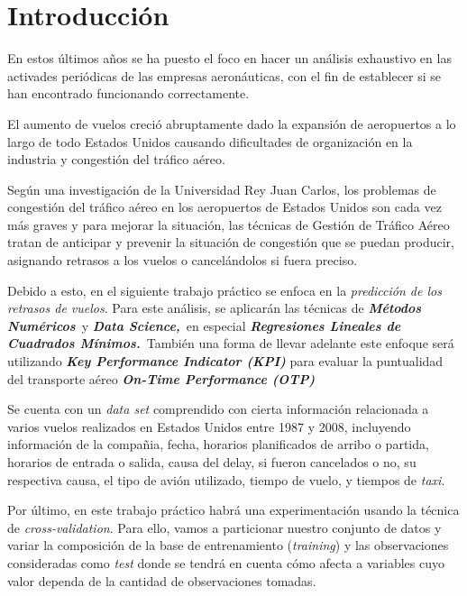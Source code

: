 \section{Introducción}

En estos últimos años se ha puesto el foco en hacer un análisis
exhaustivo en las activades periódicas de las empresas aeronáuticas,
con el fin de establecer si se han encontrado funcionando
correctamente.

\vspace{0.5em} El aumento de vuelos creció abruptamente dado la
expansión de aeropuertos a lo largo de todo Estados Unidos causando
dificultades de organización en la industria y congestión del tráfico
aéreo.

\vspace{0.5em} \cite{alonso2010mathematical} Según una investigación
de la Universidad Rey Juan Carlos, los problemas de congestión del
tráfico aéreo en los aeropuertos de Estados Unidos son cada vez más
graves y para mejorar la situación, las técnicas de Gestión de Tráfico
Aéreo tratan de anticipar y prevenir la situación de congestión que se
puedan producir, asignando retrasos a los vuelos o cancelándolos si
fuera preciso.

\vspace{0.5em} Debido a esto, en el siguiente trabajo práctico se
enfoca en la \textit{predicción de los retrasos de vuelos}. Para este
análisis, se aplicarán las técnicas de \textbf{\textit{Métodos
    Numéricos}}\ y \textbf{\textit{Data Science,}}\ en especial
\textbf{\textit{Regresiones Lineales de Cuadrados Mínimos.}}\ También
una forma de llevar adelante este enfoque será utilizando
\textbf{\textit{Key Performance Indicator (KPI)}} para evaluar la
puntualidad del transporte aéreo \textbf{\textit{On-Time Performance
    (OTP)}}

\vspace{0.5em} Se cuenta con un \textit{data set} comprendido con
cierta información relacionada a varios vuelos realizados en Estados
Unidos entre 1987 y 2008, incluyendo información de la compañia,
fecha, horarios planificados de arribo o partida, horarios de entrada
o salida, causa del delay, si fueron cancelados o no, su respectiva
causa, el tipo de avión utilizado, tiempo de vuelo, y tiempos de
\textit{taxi}.

\vspace{0.5em} Por último, en este trabajo práctico habrá una
experimentación usando la técnica de \textit{cross-validation}. Para
ello, vamos a particionar nuestro conjunto de datos y variar la
composición de la base de entrenamiento (\textit{training}) y las
observaciones consideradas como \textit{test} donde se tendrá en
cuenta cómo afecta a variables cuyo valor dependa de la cantidad de
observaciones tomadas.

